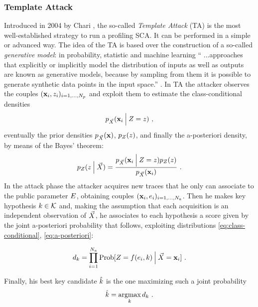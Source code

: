 \subsubsection{Template Attack}\label{sec:TA}
Introduced in 2004 by Chari \cite{Chari2003}, the so-called \emph{Template Attack} (TA) is the most well-established strategy to run a profiling SCA. It can be performed in a simple or advanced way. The idea of the TA is based over the construction of a so-called \emph{generative model}: in probability, statistic and machine learning \enquote{ ...approaches that explicitly or implicitly model the distribution of inputs as well as outputs are known as generative models, because by sampling from them it is possible to generate synthetic data points in the input space.} \cite{christopher2006pattern}.
In TA the attacker observes the couples $(\textbf{x}_i, z_i)_{i=1, \dots , N_p}$  and exploit them to estimate the class-conditional densities  
\begin{equation}\label{eq:class-conditional}
p_{\vec{X}}(\textbf{x}_i \:\Big\vert\: Z = z)\mbox{ ,}
\end{equation}
eventually the prior densities $p_{\vec{X}}(\textbf{x})$, $p_{Z}(z)$, and finally the a-posteriori density, by means of the Bayes' theorem:
\begin{equation}\label{eq:a-posteriori}
p_{Z}(z \:\Big\vert\: \vec{X}) = \frac{p_{\vec{X}}(\textbf{x}_i \:\Big\vert\: Z = z)p_{Z}(z)} {p_{\vec{X}}(\textbf{x}_i)}\mbox{ .}
\end{equation}
In the attack phase the attacker acquires new traces that he only can associate to the public parameter $E$, obtaining couples  $(\textbf{x}_i, e_i)_{i=1, \dots , N_a}$. Then he makes key hypothesis $k \in \mathcal{K}$ and, making the assumption that each acquisition is an independent observation of $\vec{X}$, he associates to each hypothesis a score given by the joint a-posteriori probability that follows, exploiting distributions \eqref{eq:class-conditional}, \eqref{eq:a-posteriori}:

\begin{equation}
d_{k} = \prod_{i=1}^{N_a}\mathrm{Prob}[Z = f(e_i,k) \:\Big\vert\: \vec{X} = \textbf{x}_i] \mbox{ .}
\end{equation}

Finally, his best key candidate $\hat{k}$ is the one maximizing such a joint probability
\begin{equation}\label{eq:max_classifier}
\hat{k} = \operatorname*{argmax}_{k} d_{k} \mbox{ .}
\end{equation}

